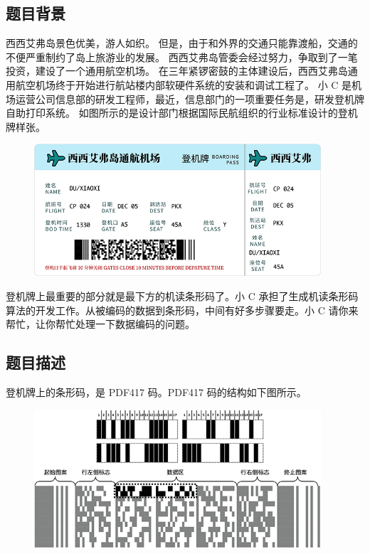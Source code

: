 \subsection*{题目背景}

西西艾弗岛景色优美，游人如织。
但是，由于和外界的交通只能靠渡船，交通的不便严重制约了岛上旅游业的发展。
西西艾弗岛管委会经过努力，争取到了一笔投资，建设了一个通用航空机场。
在三年紧锣密鼓的主体建设后，西西艾弗岛通用航空机场终于开始进行航站楼内部软硬件系统的安装和调试工程了。
小 C 是机场运营公司信息部的研发工程师，最近，信息部门的一项重要任务是，研发登机牌自助打印系统。
如图所示的是设计部门根据国际民航组织的行业标准设计的登机牌样张。

\begin{figure}[H]
    \centering
    \includegraphics[width=0.95\textwidth]{image/24/3-p-1.png}
\end{figure}

登机牌上最重要的部分就是最下方的机读条形码了。小 C 承担了生成机读条形码算法的开发工作。从被编码的数据到条形码，中间有好多步骤要走。小 C 请你来帮忙，让你帮忙处理一下数据编码的问题。

\subsection*{题目描述}

登机牌上的条形码，是 PDF417 码。PDF417 码的结构如下图所示。

\begin{figure}[H]
    \centering
    \includegraphics[width=0.95\textwidth]{image/24/3-p-2.png}
\end{figure}

